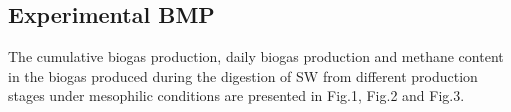 \subsection{Experimental BMP}
The cumulative biogas production, daily biogas production and methane content in the biogas produced during the digestion of SW from different production stages under mesophilic conditions are presented in Fig.1, Fig.2 and Fig.3.